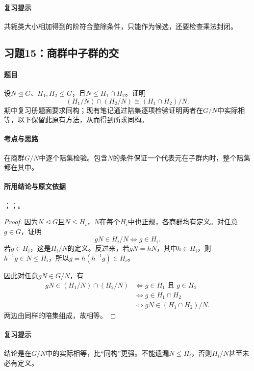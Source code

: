 \paragraph{复习提示}
共轭类大小相加得到的阶符合整除条件，只能作为候选，还要检查乘法封闭。


\subsection{习题15：\texorpdfstring{商群中子群的交}{商群中子群的交}}
\label{ex:2:15}

\paragraph{题目}
设$N\trianglelefteq G$、$H_1,H_2\le G$，且$N\le H_1\cap H_2$。证明
\[
(H_1/N)\cap(H_2/N)\cong(H_1\cap H_2)/N.
\]
期中复习册题面要求同构；现有笔记通过陪集逐项检验证明两者在$G/N$中实际相等，以下保留此原有方法，从而得到所求同构。

\paragraph{考点与思路}
在商群$G/N$中逐个陪集检验。包含$N$的条件保证一个代表元在子群内时，整个陪集都在其中。

\paragraph{所用结论与原文依据}
；；。


\begin{proof}
因为$N\trianglelefteq G$且$N\le H_i$，$N$在每个$H_i$中也正规，各商群均有定义。对任意$g\in G$，证明
\[
gN\in H_i/N\iff g\in H_i.
\]
若$g\in H_i$，这是$H_i/N$的定义。反过来，若$gN=hN$，其中$h\in H_i$，则$h^{-1}g\in N\le H_i$，所以$g=h(h^{-1}g)\in H_i$。

因此对任意$gN\in G/N$，有
\begin{align*}
gN\in(H_1/N)\cap(H_2/N)
&\iff g\in H_1\text{ 且 }g\in H_2\\
&\iff g\in H_1\cap H_2\\
&\iff gN\in(H_1\cap H_2)/N.
\end{align*}
两边由同样的陪集组成，故相等。
\end{proof}

\paragraph{复习提示}
结论是在$G/N$中的实际相等，比“同构”更强。不能遗漏$N\le H_i$，否则$H_i/N$甚至未必有定义。


